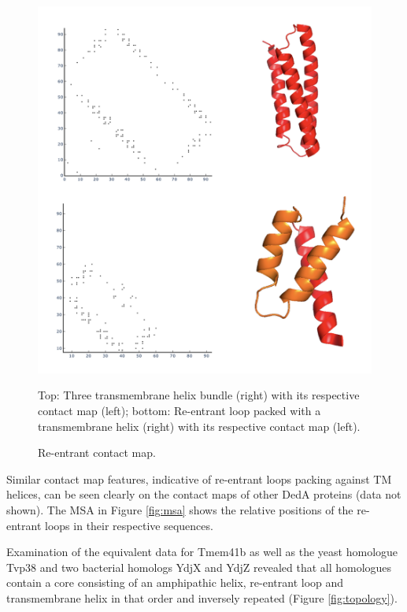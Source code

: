\begin{figure}[th!]
    \centering
    \includegraphics[width=\textwidth]{Results/rent_cmap.png}
    \caption{Re-entrant contact map.}
    \label{fig:rent_cmap}
    \small
    Top: Three transmembrane helix bundle (right) with its respective contact map (left); bottom: Re-entrant loop packed with a transmembrane helix (right) with its respective contact map (left).
\end{figure}

Similar contact map features, indicative of re-entrant loops packing against TM helices, can be seen clearly on the contact maps of other DedA proteins (data not shown). The MSA in Figure \ref{fig:msa} shows the relative positions of the re-entrant loops in their respective sequences.

Examination of the equivalent data for Tmem41b as well as the yeast homologue Tvp38 and two bacterial homologs YdjX and YdjZ revealed that all homologues contain a core consisting of an amphipathic helix, re-entrant loop and transmembrane helix in that order and inversely repeated (Figure \ref{fig:topology}). 

